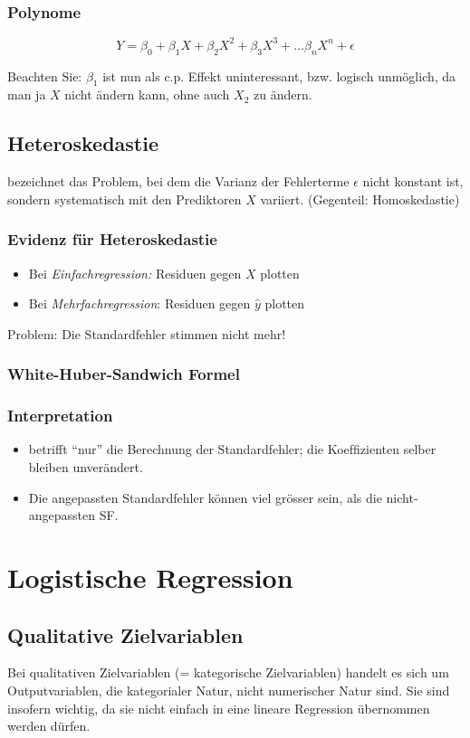 \documentclass[a3paper, 8pt]{extarticle}
\begin{document}
\begin{multicols*}{5}
\begin{enumerate}
\subsubsection{Polynome}
$$Y=\beta_0+\beta_1X+\beta_2X^2+\beta_3X^3+ \dots \beta_n X^n + \epsilon$$

Beachten Sie: $\beta_1$ ist nun als c.p. Effekt uninteressant, bzw. logisch unmöglich, da man ja $X$ nicht ändern kann, ohne auch $X_2$ zu ändern.

\subsection{Heteroskedastie} bezeichnet das Problem, bei dem die Varianz der Fehlerterme $\epsilon$ nicht konstant ist, sondern systematisch mit den Prediktoren $X$ variiert. (Gegenteil: Homoskedastie)
\subsubsection{Evidenz für Heteroskedastie}\begin{itemize}
 \item Bei \textit{Einfachregression:} Residuen gegen $X$ plotten
\item Bei \textit{Mehrfachregression}: Residuen gegen $\hat{y}$ plotten
\end{itemize}
Problem: Die Standardfehler stimmen nicht mehr!

\subsubsection{White-Huber-Sandwich Formel}

\subsubsection{Interpretation}
\begin{itemize}
    \item betrifft “nur” die Berechnung der Standardfehler; die Koefﬁzienten selber bleiben unverändert.
    \item Die angepassten Standardfehler können viel grösser sein, als die nicht-angepassten SF.
\end{itemize}

\section{Logistische Regression}
\subsection{Qualitative Zielvariablen}
Bei qualitativen Zielvariablen (= kategorische Zielvariablen) handelt es sich um Outputvariablen, die kategorialer Natur, nicht numerischer Natur sind. Sie sind insofern wichtig, da sie nicht einfach in eine lineare Regression übernommen werden dürfen.


\end{enumerate}
\end{multicols*}
\end{document}
